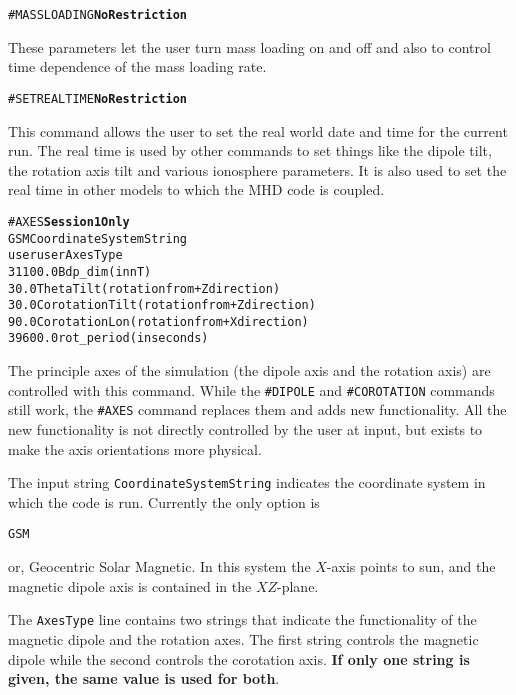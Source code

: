 \begin{alltt} 
#MASSLOADING \hfill {\bf No Restriction}
\end{alltt}

These parameters let the user turn mass loading on and off and also to control
time dependence of the mass loading rate.
\ \ \\

\begin{alltt}
#SETREALTIME   \hfill {\bf No Restriction}
\end{alltt}

This command allows the user to set the real world date and time for the current run.
The real time is used by other commands to set things like the dipole tilt,  the
rotation axis tilt and various ionosphere parameters.
It is also used to set the real time in other models to which the MHD code
is coupled.
\ \ \\

\begin{alltt}
#AXES  \hfill {\bf Session 1 Only}
GSM                    CoordinateSystemString
user user              AxesType
31100.0                Bdp_dim (in nT)
30.0                   ThetaTilt (rotation from +Z direction)
30.0                   CorotationTilt (rotation from +Z direction)
90.0                   CorotationLon (rotation from +X direction)
39600.0                rot_period (in seconds)
\end{alltt}

The principle axes of the simulation (the dipole axis and the rotation
axis) are controlled with this command.  While the {\tt \#DIPOLE} and 
{\tt \#COROTATION} commands still work, the {\tt \#AXES} command 
replaces them and adds new functionality.  All the new functionality is
not directly controlled by the user at input, but exists to make 
the axis orientations more physical.

The input string {\tt CoordinateSystemString} indicates the coordinate 
system in which the code is run.  Currently the only option is
\begin{verbatim}
GSM
\end{verbatim}
or, Geocentric Solar Magnetic.  In this system the $X$-axis points to sun, 
and the magnetic dipole axis is contained in the $XZ$-plane.

The {\tt AxesType} line contains two strings that indicate the 
functionality of the magnetic dipole  and the rotation axes.  The first string
controls the magnetic dipole while the second controls the corotation axis.  
{\bf If only one string is given, the same value is used for both}.  

